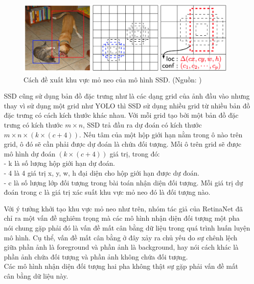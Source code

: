 {    \begin{figure}[H]
        \centering
        \includegraphics[width=11cm] {images/ssd_anchor}
        \caption{Cách đề xuất khu vực mỏ neo của mô hình SSD. (Nguồn: \cite{liu2016ssd})}
        \label{fig:ssd_anchor}
    \end{figure}
    
    \noindent
    SSD cũng sử dụng bản đồ đặc trưng như là các dạng grid của ảnh đầu vào nhưng thay vì sử dụng một grid như YOLO thì SSD sử dụng nhiều grid từ nhiều bản đồ đặc trưng có cách kích thước khác nhau.
    Với mỗi grid tạo bởi một bản đồ đặc trưng có kích thước $m × n$, SSD trả đầu ra dự đoán có kích thước $m × n × (k × (c + 4))$.
    Nếu tâm của một hộp giới hạn nằm trong ô nào trên grid, ô đó sẽ cần phải được dự đoán là chứa đối tượng.
    Mỗi ô trên grid sẽ được mô hình dự đoán $(k × (c + 4))$ giá trị, trong đó: \\
    - k là số lượng hộp giới hạn dự đoán. \\
    - 4 là 4 giá trị x, y, w, h đại diện cho hộp giới hạn được dự đoán. \\
    - c là số lượng lớp đối tượng trong bài toán nhận diện đối tượng.
    Mỗi giá trị dự đoán trong c là giá trị xác suất khu vực mỏ neo đó là đối tượng nào.

    \noindent
    Với ý tưởng khởi tạo khu vực mỏ neo như trên, nhóm tác giả của RetinaNet đã chỉ ra một vấn đề nghiêm trọng mà các mô hình nhận diện đối tượng một pha nói chung gặp phải đó là vấn đề mất cân bằng dữ liệu trong quá trình huấn luyện mô hình.
    Cụ thể, vấn đề mất cân bằng ở đây xảy ra chủ yếu do sự chênh lệch giữa phần ảnh là foreground và phần ảnh là background, hay nói cách khác là phần ảnh chứa đối tượng và phần ảnh không chứa đối tượng. \\
    Các mô hình nhận diện đối tượng hai pha không thật sự gặp phải vấn đề mất cân bằng dữ liệu này.

}
